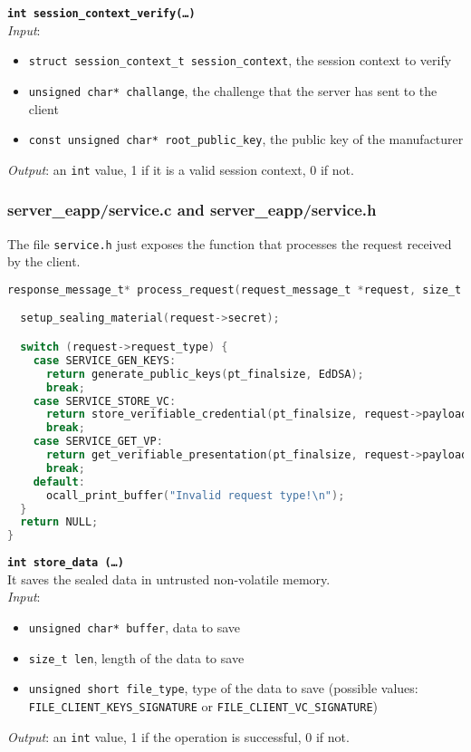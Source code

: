 \noindent
\texttt{\bfseries int session\_context\_verify(\dots)}\\
\textit{Input}:
\begin{itemize}[noitemsep,nolistsep]
  \item \texttt{struct session\_context\_t session\_context}, the session context to verify
  \item \texttt{unsigned char* challange}, the challenge that the server has sent to the client
  \item \texttt{const unsigned char* root\_public\_key}, the public key of the manufacturer
\end{itemize}
\textit{Output}: an \texttt{int} value, 1 if it is a valid session context, 0 if not.



\subsubsection{server\_eapp/service.c and server\_eapp/service.h}
The file \texttt{service.h} just exposes the function that processes the request received by the client. \\   
\begin{lstlisting}[language=C,frame=single]
response_message_t* process_request(request_message_t *request, size_t *pt_finalsize) {

  setup_sealing_material(request->secret);

  switch (request->request_type) {
    case SERVICE_GEN_KEYS:
      return generate_public_keys(pt_finalsize, EdDSA);
      break;
    case SERVICE_STORE_VC:
      return store_verifiable_credential(pt_finalsize, request->payload, request->len);
      break;
    case SERVICE_GET_VP:
      return get_verifiable_presentation(pt_finalsize, request->payload, request->len, EdDSA);
      break;
    default:  
      ocall_print_buffer("Invalid request type!\n");
  }
  return NULL;
}
\end{lstlisting}
\leavevmode\newline

\noindent
\texttt{\bfseries int store\_data (\dots)}\\
It saves the sealed data in untrusted non-volatile memory. \\
\textit{Input}:
\begin{itemize}[noitemsep,nolistsep]
  \item \texttt{unsigned char* buffer}, data to save
  \item \texttt{size\_t len}, length of the data to save
  \item \texttt{unsigned short file\_type}, type of the data to save (possible values: \texttt{FILE\_CLI\-ENT\_KEYS\_SIGNATURE} or \texttt{FILE\_CLIENT\_VC\_SIGNATURE})
\end{itemize}
\textit{Output}: an \texttt{int} value, 1 if the operation is successful, 0 if not. \\

